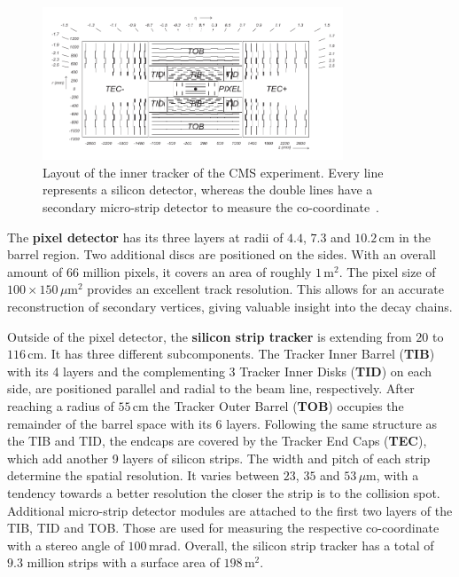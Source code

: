 \begin{figure}[ht!]
  \centering
  \includegraphics[width=0.8\textwidth]{plots/innertracker.pdf}
  \caption{Layout of the inner tracker of the CMS experiment. Every line represents a silicon detector, whereas the double lines have a secondary micro-strip detector to measure the co-coordinate~\cite{cmsjinst}.}
  \label{fig:inntrk}
\end{figure}

The \textbf{pixel detector} has its three layers at radii of $4.4$, $7.3$ and $10.2\,\text{cm}$ in the barrel region. Two additional discs are positioned on the sides. With an overall amount of $66$ million pixels, it covers an area of roughly $1\,\text{m}^2$. The pixel size of $100 \times 150\,\mu\text{m}^2$ provides an excellent track resolution. This allows for an accurate reconstruction of secondary vertices, giving valuable insight into the decay chains.

Outside of the pixel detector, the \textbf{silicon strip tracker} is extending from $20$ to $116\,\text{cm}$. It has three different subcomponents. The Tracker Inner Barrel (\textbf{TIB}) with its 4 layers and the complementing 3 Tracker Inner Disks (\textbf{TID}) on each side, are positioned parallel and radial to the beam line, respectively. After reaching a radius of $55\,\text{cm}$ the Tracker Outer Barrel (\textbf{TOB}) occupies the remainder of the barrel space with its 6 layers. Following the same structure as the TIB and TID, the endcaps are covered by the Tracker End Caps (\textbf{TEC}), which add another 9 layers of silicon strips. The width and pitch of each strip determine the spatial resolution. It varies between $23$, $35$ and $53\,\mu\text{m}$, with a tendency towards a better resolution the closer the strip is to the collision spot. Additional micro-strip detector modules are attached to the first two layers of the TIB, TID and TOB. Those are used for measuring the respective co-coordinate with a stereo angle of $100\,\text{mrad}$. Overall, the silicon strip tracker has a total of $9.3$ million strips with a surface area of $198\,\text{m}^2$.

